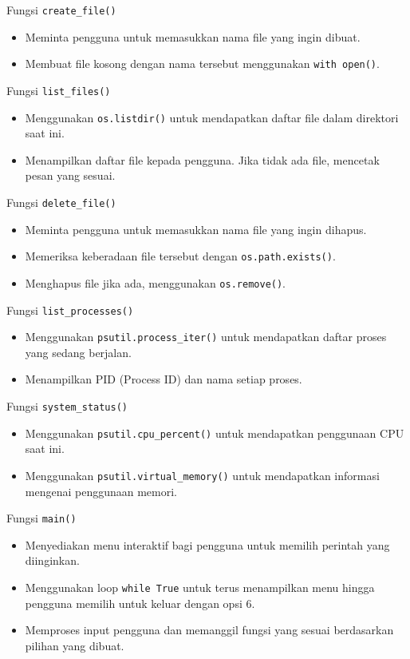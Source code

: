\documentclass[12pt]{article}
\begin{document}
\begin{enumerate}
\newline Fungsi \texttt{create\_file()}
\begin{itemize}
    \item Meminta pengguna untuk memasukkan nama file yang ingin dibuat.
    \item Membuat file kosong dengan nama tersebut menggunakan \texttt{with open()}.
\end{itemize}

\newline Fungsi \texttt{list\_files()}
\begin{itemize}
    \item Menggunakan \texttt{os.listdir()} untuk mendapatkan daftar file dalam direktori saat ini.
    \item Menampilkan daftar file kepada pengguna. Jika tidak ada file, mencetak pesan yang sesuai.
\end{itemize}

\newline Fungsi \texttt{delete\_file()}
\begin{itemize}
    \item Meminta pengguna untuk memasukkan nama file yang ingin dihapus.
    \item Memeriksa keberadaan file tersebut dengan \texttt{os.path.exists()}.
    \item Menghapus file jika ada, menggunakan \texttt{os.remove()}.
\end{itemize}

\newline Fungsi \texttt{list\_processes()}
\begin{itemize}
    \item Menggunakan \texttt{psutil.process\_iter()} untuk mendapatkan daftar proses yang sedang berjalan.
    \item Menampilkan PID (Process ID) dan nama setiap proses.
\end{itemize}

\newline Fungsi \texttt{system\_status()}
\begin{itemize}
    \item Menggunakan \texttt{psutil.cpu\_percent()} untuk mendapatkan penggunaan CPU saat ini.
    \item Menggunakan \texttt{psutil.virtual\_memory()} untuk mendapatkan informasi mengenai penggunaan memori.
\end{itemize}

\newline Fungsi \texttt{main()}
\begin{itemize}
    \item Menyediakan menu interaktif bagi pengguna untuk memilih perintah yang diinginkan.
    \item Menggunakan loop \texttt{while True} untuk terus menampilkan menu hingga pengguna memilih untuk keluar dengan opsi 6.
    \item Memproses input pengguna dan memanggil fungsi yang sesuai berdasarkan pilihan yang dibuat.
\end{itemize}
\end{enumerate}
\end{document}
